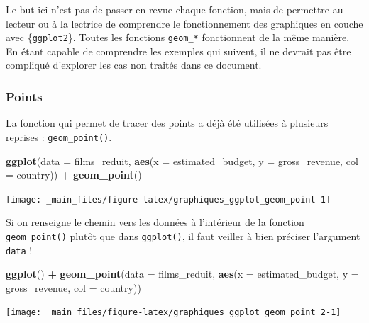\documentclass[
  11pt,
]{book}
\newenvironment{Shaded}{\begin{snugshade}}{\end{snugshade}}
\newcommand{\DataTypeTok}[1]{\textcolor[rgb]{0.13,0.29,0.53}{#1}}
\newcommand{\KeywordTok}[1]{\textcolor[rgb]{0.13,0.29,0.53}{\textbf{#1}}}
\newcommand{\NormalTok}[1]{#1}
\newcommand{\OperatorTok}[1]{\textcolor[rgb]{0.81,0.36,0.00}{\textbf{#1}}}
\newcommand{\StringTok}[1]{\textcolor[rgb]{0.31,0.60,0.02}{#1}}
\numberwithin{equation}{section}
\numberwithin{countremarque}{section}
\begin{document}
Le but ici n'est pas de passer en revue chaque fonction, mais de permettre au lecteur ou à la lectrice de comprendre le fonctionnement des graphiques en couche avec \{\texttt{ggplot2}\}. Toutes les fonctions \texttt{geom\_*} fonctionnent de la même manière. En étant capable de comprendre les exemples qui suivent, il ne devrait pas être compliqué d'explorer les cas non traités dans ce document.

\hypertarget{graphiques_ggplot_geom_points}{%
\subsubsection{Points}\label{graphiques_ggplot_geom_points}}

La fonction qui permet de tracer des points a déjà été utilisées à plusieurs reprises : \texttt{geom\_point()}.

\begin{Shaded}
\begin{Highlighting}[]
\KeywordTok{ggplot}\NormalTok{(}\DataTypeTok{data =}\NormalTok{ films\_reduit,}
       \KeywordTok{aes}\NormalTok{(}\DataTypeTok{x =}\NormalTok{ estimated\_budget,}
           \DataTypeTok{y =}\NormalTok{ gross\_revenue, }\DataTypeTok{col =}\NormalTok{ country)) }\OperatorTok{+}
\StringTok{  }\KeywordTok{geom\_point}\NormalTok{()}
\end{Highlighting}
\end{Shaded}

\begin{center}\texttt{[image: \_main\_files/figure-latex/graphiques\_ggplot\_geom\_point-1]} \end{center}

Si on renseigne le chemin vers les données à l'intérieur de la fonction \texttt{geom\_point()} plutôt que dans \texttt{ggplot()}, il faut veiller à bien préciser l'argument \texttt{data} !

\begin{Shaded}
\begin{Highlighting}[]
\KeywordTok{ggplot}\NormalTok{() }\OperatorTok{+}
\StringTok{  }\KeywordTok{geom\_point}\NormalTok{(}\DataTypeTok{data =}\NormalTok{ films\_reduit,}
       \KeywordTok{aes}\NormalTok{(}\DataTypeTok{x =}\NormalTok{ estimated\_budget,}
           \DataTypeTok{y =}\NormalTok{ gross\_revenue, }\DataTypeTok{col =}\NormalTok{ country))}
\end{Highlighting}
\end{Shaded}

\begin{center}\texttt{[image: \_main\_files/figure-latex/graphiques\_ggplot\_geom\_point\_2-1]} \end{center}
\end{document}

